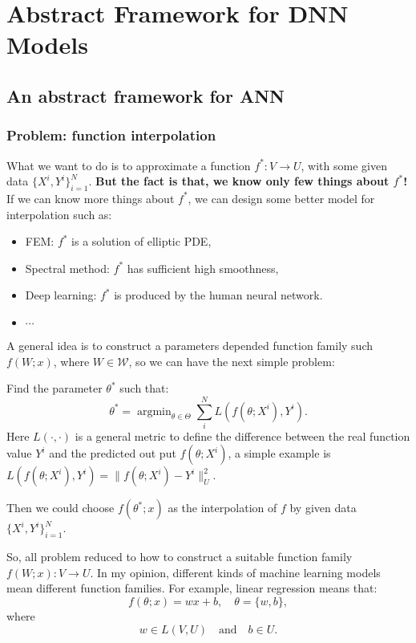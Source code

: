 \chapter{Abstract Framework for DNN Models}

\section{An abstract framework for ANN}
\subsection{Problem: function interpolation}
What we want to do is to approximate a function $f^*: V \to U$, with some given data $\{X^i, Y^i\}_{i=1}^N$. {\bf{But the fact is that, we know only few things about $f^*$!}} If we can know more things about $f^*$, we can design some better model for interpolation such as: 
\begin{itemize}
\item FEM: $f^*$ is a solution of elliptic PDE,
\item Spectral method: $f^*$ has sufficient high smoothness,
\item Deep learning: $f^*$ is produced by the human neural network. 
\item $\cdots$
\end{itemize}
A general idea is to construct a parameters depended function family such $f(W; x)$, where $W \in \mathcal{W}$, so we can have the next simple problem:
\begin{problem}
Find the parameter $\theta^{*}$ such that:
\begin{equation}
\theta^* = \mathop{\arg\min}_{\theta \in \Theta} \sum_{i}^N L(f(\theta;X^i) , Y^i).
\end{equation}
Here $L(\cdot, \cdot)$ is a general metric to define the difference between the real function value $Y^i$ and the predicted out put $f(\theta;X^i)$, a simple example is $ L(f(\theta;X^i) , Y^i) = \|f(\theta;X^i) - Y^i\|^2_{U}$. 
\end{problem}
Then we could choose $f(\theta^*; x)$ as the interpolation of $f$ by given data $\{X^i, Y^i\}_{i=1}^N$.

So, all problem reduced to how to construct a suitable function family $f(W;x): V \to U$. In my opinion, different kinds of machine learning models mean different function families. For example, linear regression means that: 
\begin{equation}
f(\theta; x) = w x + b, \quad \theta = \{w, b \},
\end{equation}
where
\begin{equation}
w \in L(V, U) \quad \text{and} \quad b \in U .
\end{equation}


